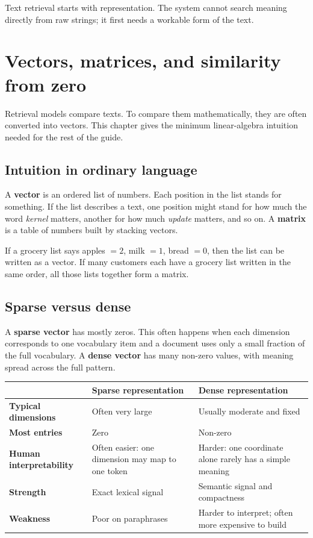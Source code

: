\documentclass[11pt,oneside]{report}
\newcommand{\term}[1]{\textbf{#1}}
\begin{document}
\begin{rememberbox}
Text retrieval starts with representation. The system cannot search meaning directly from raw strings; it first needs a workable form of the text.
\end{rememberbox}


\chapter[Vectors, Matrices, and Similarity]{Vectors, matrices, and similarity from zero}

\begin{purposebox}
Retrieval models compare texts. To compare them mathematically, they are often converted into vectors. This chapter gives the minimum linear-algebra intuition needed for the rest of the guide.
\end{purposebox}

\section*{Intuition in ordinary language}
A \term{vector} is an ordered list of numbers. Each position in the list stands for something. If the list describes a text, one position might stand for how much the word \emph{kernel} matters, another for how much \emph{update} matters, and so on. A \term{matrix} is a table of numbers built by stacking vectors.

\begin{intuitionbox}
If a grocery list says apples $=2$, milk $=1$, bread $=0$, then the list can be written as a vector. If many customers each have a grocery list written in the same order, all those lists together form a matrix.
\end{intuitionbox}

\section*{Sparse versus dense}
A \term{sparse vector} has mostly zeros. This often happens when each dimension corresponds to one vocabulary item and a document uses only a small fraction of the full vocabulary. A \term{dense vector} has many non-zero values, with meaning spread across the full pattern.

\begin{center}
\begin{tabularx}{\textwidth}{>{\bfseries}lYY}
\toprule
 & Sparse representation & Dense representation \\
\midrule
Typical dimensions & Often very large & Usually moderate and fixed \\
Most entries & Zero & Non-zero \\
Human interpretability & Often easier: one dimension may map to one token & Harder: one coordinate alone rarely has a simple meaning \\
Strength & Exact lexical signal & Semantic signal and compactness \\
Weakness & Poor on paraphrases & Harder to interpret; often more expensive to build \\
\bottomrule
\end{tabularx}
\end{center}
\end{document}
